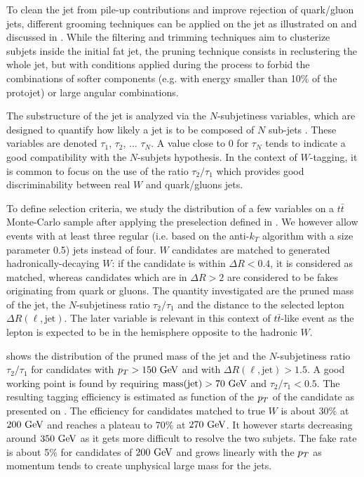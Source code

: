     To clean the jet from pile-up contributions and improve rejection of
    quark/gluon jets, different grooming techniques can be applied on the jet as
    illustrated on  and discussed in
    \cite{jetClusteringComparison, JME-13-006}.  While the filtering and
    trimming techniques aim to clusterize subjets inside the initial fat jet,
    the pruning technique consists in reclustering the whole jet, but with
    conditions applied during the process to forbid the combinations of softer
    components (e.g. with energy smaller than 10\% of the protojet) or large
    angular combinations.

    The substructure of the jet is analyzed via the $N$-subjetiness variables,
    which are designed to quantify how likely a jet is to be composed of $N$
    sub-jets \cite{N-subjettiness}. These variables are denoted $\tau_1$,
    $\tau_2$, ... $\tau_N$. A value close to 0 for $\tau_N$ tends to indicate a
    good compatibility with the $N$-subjets hypothesis. In the context of
    $W$-tagging, it is common to focus on the use of the ratio $\tau_2/\tau_1$
    which provides good discriminability between real $W$ and quark/gluons jets.

    To define selection criteria, we study the distribution of a few variables
    on a $t\bar{t}$ Monte-Carlo sample after applying the preselection defined
    in . We however allow
    events with at least three regular (i.e. based on the anti-$k_T$ algorithm
    with a size parameter 0.5) jets instead of four. $W$ candidates are matched
    to generated hadronically-decaying $W$: if the candidate is within $\Delta R
    < 0.4$, it is considered as matched, whereas candidates which are in $\Delta
    R > 2$ are considered to be fakes originating from quark or gluons.  The
    quantity investigated are the pruned mass of the jet, the $N$-subjetiness
    ratio $\tau_2 / \tau_1$ and the distance to the selected lepton $\Delta R
    (\ell,\text{jet})$.  The later variable is relevant in this context of
    $t\bar{t}$-like event as the lepton is expected to be in the hemisphere
    opposite to the hadronic $W$.

     shows the distribution of the pruned mass of
    the jet and the $N$-subjetiness ratio $\tau_2 / \tau_1$ for candidates with
    $p_T > 150~\text{GeV}$ and with $\Delta R(\ell,\text{jet}) > 1.5$. A good working
    point is found by requiring $\text{mass}(\text{jet}) > 70~\text{GeV}$ and $\tau_2 /
    \tau_1 < 0.5$.  The resulting tagging efficiency is estimated as function of
    the $p_T$ of the candidate as presented on
    .  The efficiency for
    candidates matched to true $W$ is about 30\% at $200~\text{GeV}$ and reaches a
    plateau to 70\% at $270~\text{GeV}$. It however starts decreasing around $350~\text{GeV}$
    as it gets more difficult to resolve the two subjets. The fake rate is about
    5\% for candidates of $200~\text{GeV}$ and grows linearly with the $p_T$ as
    momentum tends to create unphysical large mass for the jets.

